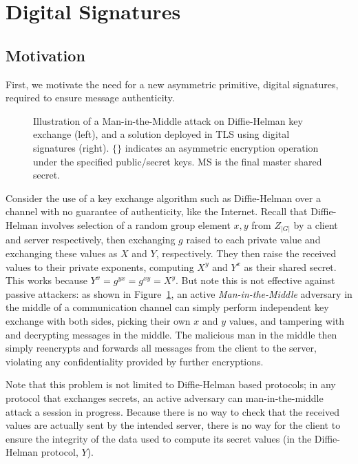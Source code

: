 \section{Digital Signatures}
\label{sec:pke}

\subsection{Motivation}

First, we motivate the need for a new asymmetric primitive, digital signatures, required to ensure message authenticity.


\begin{figure}[h]
\centering
\scalebox{0.8}{}
  \caption{Illustration of a Man-in-the-Middle attack on Diffie-Helman key exchange (left), and a solution deployed in TLS using digital signatures (right).  $\{\}$ indicates an asymmetric encryption operation under the specified public/secret keys.  MS is the final master shared secret.}
\label{fig:mitmdiffie}
\end{figure}

Consider the use of a key exchange algorithm such as Diffie-Helman over a channel with no guarantee of authenticity, like the Internet.  Recall that Diffie-Helman involves selection of a random group element $x, y$ from ${Z}_{|G|}$ by a client and server respectively, then exchanging $g$ raised to each private value and exchanging these values as $X$ and $Y$, respectively.  They then raise the received values to their private exponents, computing $X^y$ and $Y^x$ as their shared secret.  This works because $Y^x=g^{yx}=g^{xy}=X^y$.  But note this is not effective against passive attackers: as shown in Figure~\ref{fig:mitmdiffie}, an active \emph{Man-in-the-Middle} adversary in the middle of a communication channel can simply perform independent key exchange with both sides, picking their own $x$ and $y$ values, and tampering with and decrypting messages in the middle.  The malicious man in the middle then simply reencrypts and forwards all messages from the client to the server, violating any confidentiality provided by further encryptions.

Note that this problem is not limited to Diffie-Helman based protocols; in any protocol that exchanges secrets, an active adversary can man-in-the-middle attack a session in progress.  Because there is no way to check that the received values are actually sent by the intended server, there is no way for the client to ensure the integrity of the data used to compute its secret values (in the Diffie-Helman protocol, $Y$).

